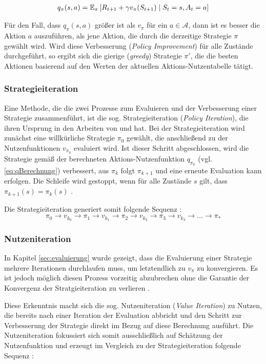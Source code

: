 \begin{equation}\label{eq:qBerechnung}
    \begin{aligned}
        q_\pi(s,a) = \operatorname{\mathbb{E}}_\pi\left[ R_{t+1} + \gamma v_\pi(S_{t+1}) \mid S_t = s, A_t=a\right]
    \end{aligned}
\end{equation}

Für den Fall, dass $q_\pi(s,a)$ größer ist als $v_\pi$ für ein $a \in \mathcal{A}$, dann ist es besser die Aktion $a$ auszuführen, als jene Aktion, die durch die derzeitige Strategie $\pi$ gewählt wird. Wird diese Verbesserung (\textit{Policy Improvement}) für alle Zustände durchgeführt, so ergibt sich die gierige (\textit{greedy}) Strategie $\pi'$, die die besten Aktionen basierend auf den Werten der aktuellen Aktions-Nutzentabelle tätigt.

\subsubsection{Strategieiteration}
Eine Methode, die die zwei Prozesse zum Evaluieren und der Verbesserung einer Strategie zusammenführt, ist die sog. Strategieiteration (\textit{Policy Iteration}), die ihren Ursprung in den Arbeiten von \cite{bellman1957dynamic} und \cite{howard1960dynamic} hat. 
\newpage
Bei der Strategieiteration wird zunächst eine willkürliche Strategie $\pi_0$ gewählt, die anschließend zu der Nutzenfunktionen $v_{\pi_k}$ evaluiert wird. Ist dieser Schritt abgeschlossen, wird die Strategie gemäß der berechneten Aktions-Nutzenfunktion $q_{\pi_k}$ (vgl. \ref{eq:qBerechnung}) verbessert, aus $\pi_k$ folgt $\pi_{k+1}$ und eine erneute Evaluation kann erfolgen. Die Schleife wird gestoppt, wenn für alle Zustände $s$ gilt, dass $\pi_{k+1}(s) = \pi_k(s)$ \cite[S.~22]{Wiering}. 
\par 
Die Strategieiteration generiert somit folgende Sequenz \cite[S.~22]{Wiering}:
\begin{equation}\label{eq:policyItSeq}
\pi_0 \rightarrow v_{k_0} \rightarrow  \pi_1 \rightarrow v_{k_1} \rightarrow  \pi_2 \rightarrow v_{k_2}\rightarrow  \pi_3 \rightarrow v_{k_3}\rightarrow \dots \rightarrow \pi_*
\end{equation}

\subsubsection{Nutzeniteration}\label{sec:Nutzeniteration}
In Kapitel \ref{sec:evaluierung} wurde gezeigt, dass die Evaluierung einer Strategie mehrere Iterationen durchlaufen muss, um letztendlich zu $v_\pi$ zu konvergieren. Es ist jedoch möglich diesen Prozess vorzeitig abzubrechen ohne die Garantie der Konvergenz der Stratgieiteration zu verlieren \cite[S.~82]{Sutton1998}. 
\par 
Diese Erkenntnis macht sich die sog. Nutzeniteration (\textit{Value Iteration}) zu Nutzen, die bereits nach einer Iteration der Evaluation abbricht und den Schritt zur Verbesserung der Strategie direkt im Bezug auf diese Berechnung ausführt. Die Nutzeniteration fokussiert sich somit ausschließlich auf Schätzung der Nutzenfunktion und erzeugt im Vergleich zu der Strategieiteration folgende Sequenz \cite[S.~23]{Wiering}:

